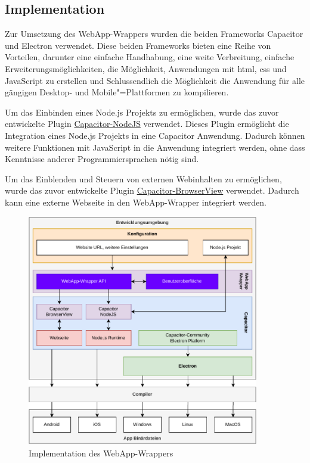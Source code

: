 \subsection{Implementation}

Zur Umsetzung des WebApp-Wrappers wurden die beiden Frameworks Capacitor und Electron verwendet.
Diese beiden Frameworks bieten eine Reihe von Vorteilen, darunter eine einfache Handhabung, eine weite Verbreitung, einfache Erweiterungsmöglichkeiten, die Möglichkeit, Anwendungen mit \ac{html}, \ac{css} und JavaScript zu erstellen und Schlussendlich die Möglichkeit die Anwendung für alle gängigen Desktop- und Mobile"=Plattformen zu kompilieren.
\cite{capacitor:docs, electron:docs}

Um das Einbinden eines Node.js Projekts zu ermöglichen, wurde das zuvor entwickelte Plugin \hyperref[sec:Capacitor-NodeJS]{Capacitor-NodeJS} verwendet.
Dieses Plugin ermöglicht die Integration eines Node.js Projekts in eine Capacitor Anwendung.
Dadurch können weitere Funktionen mit JavaScript in die Anwendung integriert werden, ohne dass Kenntnisse anderer Programmiersprachen nötig sind.

Um das Einblenden und Steuern von externen Webinhalten zu ermöglichen, wurde das zuvor entwickelte Plugin \hyperref[sec:Capacitor-BrowserView]{Capacitor-BrowserView} verwendet.
Dadurch kann eine externe Webseite in den WebApp-Wrapper integriert werden.

\begin{figure}[H]
  \centering
  \includegraphics[width=0.9\textwidth]{assets/04_WebApp-Wrapper/01_Implementation.drawio.pdf}
  \caption[WebApp-Wrapper / Implementation]{Implementation des WebApp-Wrappers}
  \label{asset:WebApp-Wrapper:Implementation}
\end{figure}

